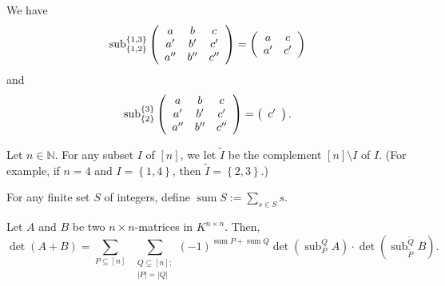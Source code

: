 \begin{example}
We have%
\[
\operatorname*{sub}\nolimits_{\left\{  1,2\right\}  }^{\left\{  1,3\right\}
}\left(
\begin{array}
[c]{ccc}%
a & b & c\\
a^{\prime} & b^{\prime} & c^{\prime}\\
a^{\prime\prime} & b^{\prime\prime} & c^{\prime\prime}%
\end{array}
\right)  =\left(
\begin{array}
[c]{cc}%
a & c\\
a^{\prime} & c^{\prime}%
\end{array}
\right)
\]
and%
\[
\operatorname*{sub}\nolimits_{\left\{  2\right\}  }^{\left\{  3\right\}
}\left(
\begin{array}
[c]{ccc}%
a & b & c\\
a^{\prime} & b^{\prime} & c^{\prime}\\
a^{\prime\prime} & b^{\prime\prime} & c^{\prime\prime}%
\end{array}
\right)  =\left(
\begin{array}
[c]{c}%
c^{\prime}%
\end{array}
\right)  .
\]

\end{example}

\begin{theorem}
\label{thm.det.det(A+B)}Let $n\in\mathbb{N}$. For any subset $I$ of $\left[
n\right]  $, we let $\widetilde{I}$ be the complement $\left[  n\right]
\setminus I$ of $I$. (For example, if $n=4$ and $I=\left\{  1,4\right\}  $,
then $\widetilde{I}=\left\{  2,3\right\}  $.)

For any finite set $S$ of integers, define $\operatorname*{sum}S:=\sum_{s\in
S}s$.

Let $A$ and $B$ be two $n\times n$-matrices in $K^{n\times n}$. Then,%
\[
\det\left(  A+B\right)  =\sum_{P\subseteq\left[  n\right]  }\ \ \sum
_{\substack{Q\subseteq\left[  n\right]  ;\\\left\vert P\right\vert =\left\vert
Q\right\vert }}\left(  -1\right)  ^{\operatorname*{sum}P+\operatorname*{sum}%
Q}\det\left(  \operatorname*{sub}\nolimits_{P}^{Q}A\right)  \cdot\det\left(
\operatorname*{sub}\nolimits_{\widetilde{P}}^{\widetilde{Q}}B\right)  .
\]

\end{theorem}


